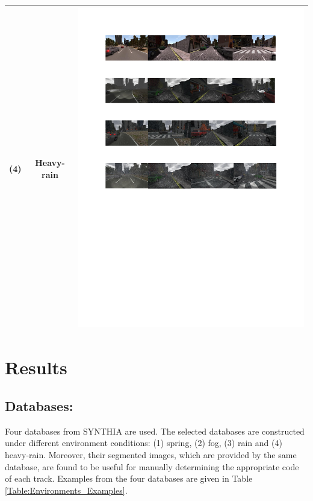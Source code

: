 \documentclass{svproc}
\begin{document}
\begin{table}[!t]
\begin{tabular}{|C{1.5cm}|c|C{8.5cm}|}
		(4)	& Heavy- rain & \begin{minipage}{.9\textwidth}\includegraphics[scale=.5,trim=2cm 12.5cm 2cm 14.3cm,clip]{examples.pdf}\end{minipage} \\ \hline
	\end{tabular}
\end{table}

\section{Results}
\subsection{Databases:} 
Four databases from SYNTHIA \cite{Ros2016TheSYNTHIA} are used. The selected databases are constructed under different environment conditions: (1) spring, (2) fog, (3) rain and (4) heavy-rain. Moreover, their segmented images, which are provided by the same database, are found to be useful for manually determining the appropriate code of each track. Examples from the four databases are given in Table \ref{Table:Environments_Examples}.	
\end{document}
